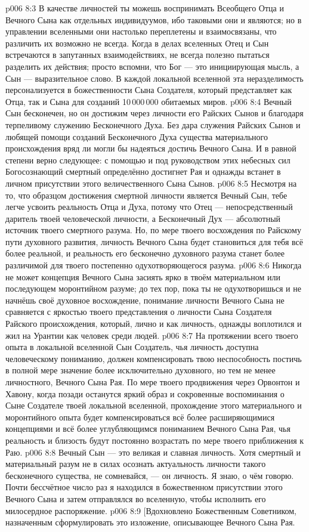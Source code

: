 \vs p006 8:3 В качестве личностей ты можешь воспринимать Всеобщего Отца и Вечного Сына как отдельных индивидуумов, ибо таковыми они и являются; но в управлении вселенными они настолько переплетены и взаимосвязаны, что различить их возможно не всегда. Когда в делах вселенных Отец и Сын встречаются в запутанных взаимодействиях, не всегда полезно пытаться разделить их действия; просто вспомни, что Бог --- это инициирующая мысль, а Сын --- выразительное слово. В каждой локальной вселенной эта неразделимость персонализуется в божественности Сына Создателя, который представляет как Отца, так и Сына для созданий 10\,000\,000 обитаемых миров.
\vs p006 8:4 Вечный Сын бесконечен, но он достижим через личности его Райских Сынов и благодаря терпеливому служению Бесконечного Духа. Без дара служения Райских Сынов и любящей помощи созданий Бесконечного Духа существа материального происхождения вряд ли могли бы надеяться достичь Вечного Сына. И в равной степени верно следующее: с помощью и под руководством этих небесных сил Богосознающий смертный определённо достигнет Рая и однажды встанет в личном присутствии этого величественного Сына Сынов.
\vs p006 8:5 \pc Несмотря на то, что образцом достижения смертной личности является Вечный Сын, тебе легче усвоить реальность Отца и Духа, потому что Отец --- непосредственный даритель твоей человеческой личности, а Бесконечный Дух --- абсолютный источник твоего смертного разума. Но, по мере твоего восхождения по Райскому пути духовного развития, личность Вечного Сына будет становиться для тебя всё более реальной, и реальность его бесконечно духовного разума станет более различимой для твоего постепенно одухотворяющегося разума.
\vs p006 8:6 Никогда не может концепция Вечного Сына засиять ярко в твоём материальном или последующем моронтийном разуме; до тех пор, пока ты не одухотворишься и не начнёшь своё духовное восхождение, понимание личности Вечного Сына не сравняется с яркостью твоего представления о личности Сына Создателя Райского происхождения, который, лично и как личность, однажды воплотился и жил на Урантии как человек среди людей.
\vs p006 8:7 На протяжении всего твоего опыта в локальной вселенной Сын Создатель, чья личность доступна человеческому пониманию, должен компенсировать твою неспособность постичь в полной мере значение более исключительно духовного, но тем не менее личностного, Вечного Сына Рая. По мере твоего продвижения через Орвонтон и Хавону, когда позади останутся яркий образ и сокровенные воспоминания о Сыне Создателе твоей локальной вселенной, прохождение этого материального и моронтийного опыта будет компенсироваться всё более расширяющимися концепциями и всё более углубляющимся пониманием Вечного Сына Рая, чья реальность и близость будут постоянно возрастать по мере твоего приближения к Раю.
\vs p006 8:8 \pc Вечный Сын --- это великая и славная личность. Хотя смертный и материальный разум не в силах осознать актуальность личности такого бесконечного существа, не сомневайся, --- он личность. Я знаю, о чём говорю. Почти бессчётное число раз я находился в божественном присутствии этого Вечного Сына и затем отправлялся во вселенную, чтобы исполнить его милосердное распоряжение.
\vsetoff
\vs p006 8:9 [Вдохновлено Божественным Советником, назначенным сформулировать это изложение, описывающее Вечного Сына Рая.
\quizlink
